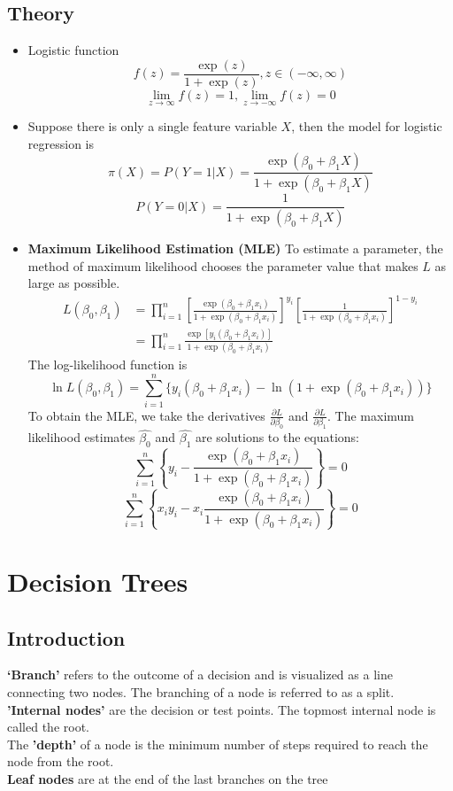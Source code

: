 \documentclass{article}
\begin{document}
\subsection{Theory}
\begin{itemize}
 \item Logistic function
 $$f(z) = \frac{\exp(z)}{1+\exp(z)}, z \in (-\infty,\infty)$$
 $$\lim_{z\rightarrow \infty}f(z) = 1, \lim_{z\rightarrow -\infty}f(z) = 0$$
 \item Suppose there is only a single feature variable $X$, then the model for logistic regression is
 $$ \pi(X) = P(Y=1|X) = \frac{\exp(\beta_0 + \beta_1 X)}{1 +\exp(\beta_0 + \beta_1 X)} $$
 $$ P(Y=0|X) = \frac{1}{1 +\exp(\beta_0 + \beta_1 X)} $$
 \item \textbf{Maximum Likelihood Estimation (MLE)} To estimate a parameter, the method of maximum likelihood chooses the parameter value that makes $L$ as large as possible.
 \begin{equation*}
 \begin{split}
  L(\beta_0, \beta_1) &= \prod_{i=1}^n \left[\frac{\exp(\beta_0 + \beta_1 x_i)}{1 +\exp(\beta_0 + \beta_1 x_i)}\right]^{y_i} \left[\frac{1}{1 +\exp(\beta_0 + \beta_1 x_i)}\right]^{1-y_i}\\
  &= \prod_{i=1}^n \frac{\exp[y_i(\beta_0 + \beta_1 x_i)]}{1 +\exp(\beta_0 + \beta_1 x_i)}
 \end{split} 
 \end{equation*}
 The log-likelihood function is
 $$\ln L(\beta_0, \beta_1) = \sum_{i=1}^n \{y_i(\beta_0 + \beta_1 x_i) - \ln(1 +\exp(\beta_0 + \beta_1 x_i))  \} $$
 To obtain the MLE, we take the derivatives $\frac{\partial L}{\partial \beta_0}$ and $\frac{\partial L}{\partial \beta_1}$. The maximum likelihood estimates $\hat{\beta_0}$ and $\hat{\beta_1}$ are solutions to the equations:
 \begin{equation}
 \sum_{i=1}^n\left\{ y_i - \frac{\exp(\beta_0 + \beta_1 x_i)}{1+\exp(\beta_0 + \beta_1 x_i)}\right\} = 0
 \end{equation}
 \begin{equation}
 \sum_{i=1}^n\left\{x_i y_i - x_i\frac{\exp(\beta_0 + \beta_1 x_i)}{1+\exp(\beta_0 + \beta_1 x_i)}\right\} = 0
 \end{equation}
\end{itemize}

\section{Decision Trees}
\subsection{Introduction}
\textbf{‘Branch’} refers to the outcome of a decision and is visualized
as a line connecting two nodes. The branching of a node is referred to as a split.\\
\textbf{'Internal nodes'} are the decision or test points. The topmost internal node is called the root. \\The \textbf{'depth'} of a node is the minimum number of steps required to reach the node from the root. \\\textbf{Leaf nodes} are at the end of the last branches on the tree
\end{document}
